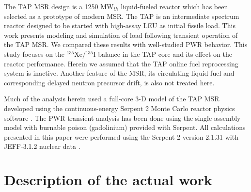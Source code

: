 \documentclass{anstrans}
\begin{document}
The \gls{TAP} \gls{MSR} design is a 1250 MW$_{th}$ liquid-fueled reactor which 
has been selected as a prototype of modern \gls{MSR}. The \gls{TAP} is an 
intermediate spectrum reactor designed to be started with high-assay \gls{LEU}
 as initial fissile load. This work presents modeling and simulation of 
load following transient operation of the \gls{TAP} \gls{MSR}. We 
compared these results with well-studied \gls{PWR} behavior. This study 
focuses on the $^{135}$Xe/$^{135}$I balance in the \gls{TAP} core and its 
effect on the reactor performance. Herein we assumed that the \gls{TAP} 
online fuel reprocessing system is inactive. Another feature of the \gls{MSR}, 
its circulating liquid fuel and corresponding delayed neutron precursor drift, 
is also not treated here.

Much of the analysis herein used a full-core 3-D model of the \gls{TAP} 
\gls{MSR} developed using the continuous-energy Serpent 2 Monte Carlo reactor 
physics software \cite{leppanen_serpent_2015}. The \gls{PWR} transient 
analysis has been done using the single-assembly model with burnable poison 
(gadolinium) provided with Serpent. All calculations presented in this paper 
were performed using the Serpent 2 version 2.1.31 with JEFF-3.1.2 nuclear data 
\cite{oecd/nea_jeff-3.1.2_2014}.
\section{Description of the actual work}
\end{document}
